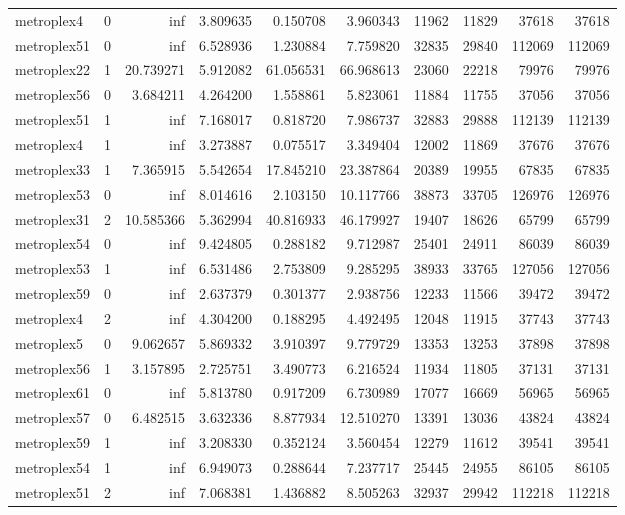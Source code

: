 \begin{longtable}{|l|r|r|r|r|r|r|r|r|r|}
metroplex4 & 0 & inf & 3.809635 & 0.150708 & 3.960343 & 11962 & 11829 & 37618 & 37618 \\
metroplex51 & 0 & inf & 6.528936 & 1.230884 & 7.759820 & 32835 & 29840 & 112069 & 112069 \\
metroplex22 & 1 & 20.739271 & 5.912082 & 61.056531 & 66.968613 & 23060 & 22218 & 79976 & 79976 \\
metroplex56 & 0 & 3.684211 & 4.264200 & 1.558861 & 5.823061 & 11884 & 11755 & 37056 & 37056 \\
metroplex51 & 1 & inf & 7.168017 & 0.818720 & 7.986737 & 32883 & 29888 & 112139 & 112139 \\
metroplex4 & 1 & inf & 3.273887 & 0.075517 & 3.349404 & 12002 & 11869 & 37676 & 37676 \\
metroplex33 & 1 & 7.365915 & 5.542654 & 17.845210 & 23.387864 & 20389 & 19955 & 67835 & 67835 \\
metroplex53 & 0 & inf & 8.014616 & 2.103150 & 10.117766 & 38873 & 33705 & 126976 & 126976 \\
metroplex31 & 2 & 10.585366 & 5.362994 & 40.816933 & 46.179927 & 19407 & 18626 & 65799 & 65799 \\
metroplex54 & 0 & inf & 9.424805 & 0.288182 & 9.712987 & 25401 & 24911 & 86039 & 86039 \\
metroplex53 & 1 & inf & 6.531486 & 2.753809 & 9.285295 & 38933 & 33765 & 127056 & 127056 \\
metroplex59 & 0 & inf & 2.637379 & 0.301377 & 2.938756 & 12233 & 11566 & 39472 & 39472 \\
metroplex4 & 2 & inf & 4.304200 & 0.188295 & 4.492495 & 12048 & 11915 & 37743 & 37743 \\
metroplex5 & 0 & 9.062657 & 5.869332 & 3.910397 & 9.779729 & 13353 & 13253 & 37898 & 37898 \\
metroplex56 & 1 & 3.157895 & 2.725751 & 3.490773 & 6.216524 & 11934 & 11805 & 37131 & 37131 \\
metroplex61 & 0 & inf & 5.813780 & 0.917209 & 6.730989 & 17077 & 16669 & 56965 & 56965 \\
metroplex57 & 0 & 6.482515 & 3.632336 & 8.877934 & 12.510270 & 13391 & 13036 & 43824 & 43824 \\
metroplex59 & 1 & inf & 3.208330 & 0.352124 & 3.560454 & 12279 & 11612 & 39541 & 39541 \\
metroplex54 & 1 & inf & 6.949073 & 0.288644 & 7.237717 & 25445 & 24955 & 86105 & 86105 \\
metroplex51 & 2 & inf & 7.068381 & 1.436882 & 8.505263 & 32937 & 29942 & 112218 & 112218 \\

\end{longtable}
